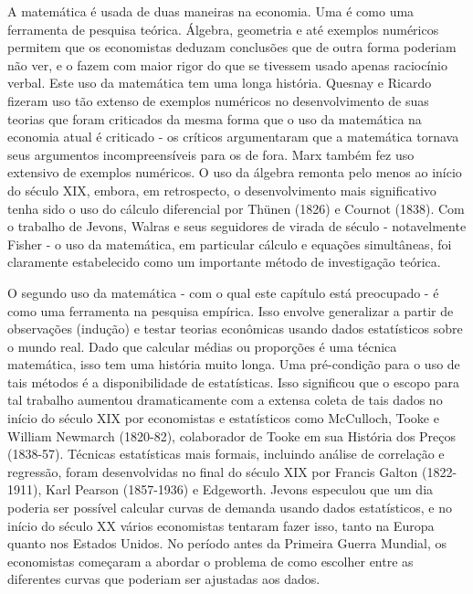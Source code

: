 \documentclass[12pt]{article}
\begin{document}
A matemática é usada de duas maneiras na economia. Uma é como uma ferramenta de pesquisa teórica. Álgebra, geometria e até exemplos numéricos permitem que os economistas deduzam conclusões que de outra forma poderiam não ver, e o fazem com maior rigor do que se tivessem usado apenas raciocínio verbal. Este uso da matemática tem uma longa história. Quesnay e Ricardo fizeram uso tão extenso de exemplos numéricos no desenvolvimento de suas teorias que foram criticados da mesma forma que o uso da matemática na economia atual é criticado - os críticos argumentaram que a matemática tornava seus argumentos incompreensíveis para os de fora. Marx também fez uso extensivo de exemplos numéricos. O uso da álgebra remonta pelo menos ao início do século XIX, embora, em retrospecto, o desenvolvimento mais significativo tenha sido o uso do cálculo diferencial por Thünen (1826) e Cournot (1838). Com o trabalho de Jevons, Walras e seus seguidores de virada de século - notavelmente Fisher - o uso da matemática, em particular cálculo e equações simultâneas, foi claramente estabelecido como um importante método de investigação teórica.

O segundo uso da matemática - com o qual este capítulo está preocupado - é como uma ferramenta na pesquisa empírica. Isso envolve generalizar a partir de observações (indução) e testar teorias econômicas usando dados estatísticos sobre o mundo real. Dado que calcular médias ou proporções é uma técnica matemática, isso tem uma história muito longa. Uma pré-condição para o uso de tais métodos é a disponibilidade de estatísticas. Isso significou que o escopo para tal trabalho aumentou dramaticamente com a extensa coleta de tais dados no início do século XIX por economistas e estatísticos como McCulloch, Tooke e William Newmarch (1820-82), colaborador de Tooke em sua História dos Preços (1838-57). Técnicas estatísticas mais formais, incluindo análise de correlação e regressão, foram desenvolvidas no final do século XIX por Francis Galton (1822-1911), Karl Pearson (1857-1936) e Edgeworth. Jevons especulou que um dia poderia ser possível calcular curvas de demanda usando dados estatísticos, e no início do século XX vários economistas tentaram fazer isso, tanto na Europa quanto nos Estados Unidos. No período antes da Primeira Guerra Mundial, os economistas começaram a abordar o problema de como escolher entre as diferentes curvas que poderiam ser ajustadas aos dados.
\end{document}
